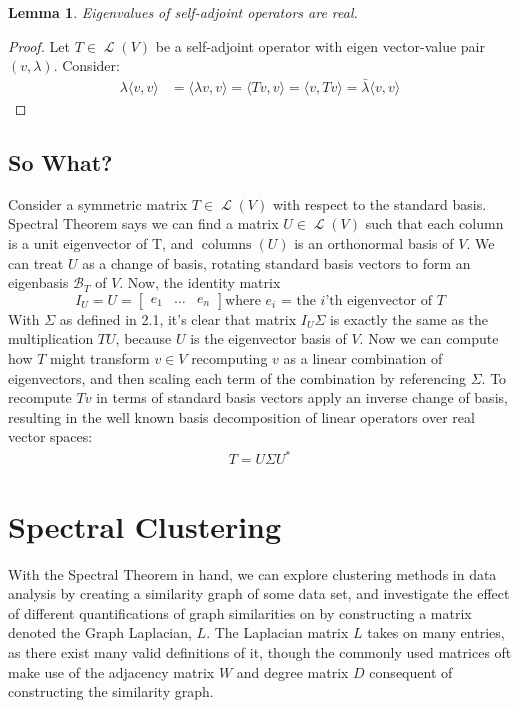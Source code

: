 \documentclass[letterpaper,12pt]{article}
\newtheorem{lemma}[theorem]{Lemma}
\newcommand{\langlerangle}[1]{\langle{#1}\rangle}
\newcommand{\linearoperator}[1]{\operatorname{\mathcal{L}}(#1)}
\newcommand{\an}[1]{{\leavevmode\color{red}{#1}}}
\begin{document}
\begin{lemma}
Eigenvalues of self-adjoint operators are real. 
\end{lemma}
\begin{proof}
Let $T \in \operatorname{\mathcal{L}}(V)$ be a self-adjoint operator with eigen vector-value pair $(v, \lambda)$. Consider:
\begin{align}
    \lambda\langlerangle{v,v} &=
    \langlerangle{\lambda v,v}=\langlerangle{Tv,v}= \langlerangle{v,Tv} =
    \bar{\lambda}\langlerangle{v,v}
\end{align}
  \an{What if $\langle v, v \rangle = 0$?}
\end{proof}

\subsection*{So What?}
Consider a symmetric matrix $T \in \linearoperator{V}$ with respect to the standard basis. Spectral Theorem says we can find a matrix $U \in \linearoperator{V}$ such that each column is a unit eigenvector of T, and $\operatorname{columns}(U)$ is an orthonormal basis of $V$. We can treat $U$ as a change of basis, rotating standard basis vectors to form an eigenbasis $\mathcal{B}_{T}$ of $V$.\an{What is an eigenbasis?} Now, the identity matrix
\[
I_U = U=
\begin{bmatrix}
e_1 & \dots & e_n
\end{bmatrix}
\text{where $e_i$ = the $i$'th eigenvector of $T$}
\]
With $\Sigma$ as defined in 2.1, it's clear that matrix $I_U \Sigma$ is exactly the same as the multiplication $TU$, because $U$ is the eigenvector basis of $V$. Now we can compute how $T$ might transform $v \in V$ recomputing $v$ as a linear combination of eigenvectors, and then scaling each term of the combination by referencing $\Sigma$. To recompute $Tv$ in terms of standard basis vectors apply an inverse change of basis, resulting in the well known basis decomposition of linear operators over real vector spaces:
\begin{align}
    T = U\Sigma U^{*}
\end{align}
\an{You were talking about inverses but I don't see any above?}

\section{Spectral Clustering}
With the Spectral Theorem in hand, we can explore clustering methods in data analysis by creating a similarity graph of some data set, and investigate the effect of different quantifications of graph similarities on by constructing a matrix denoted the Graph Laplacian, $L$. The Laplacian matrix $L$ takes on many entries, as there exist many valid definitions of it, though the commonly used matrices oft make use of the adjacency matrix $W$ and degree matrix $D$ consequent of constructing the similarity graph.
\end{document}
